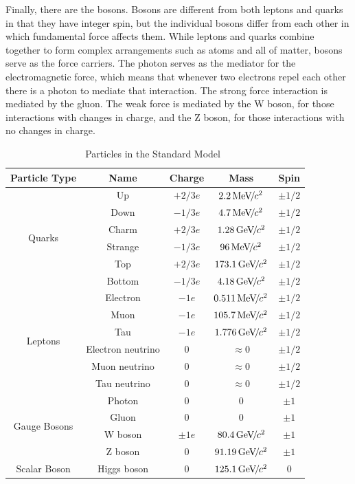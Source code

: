 Finally, there are the bosons. Bosons are different from both leptons and quarks in that they have integer spin, but the individual bosons differ from each other in which fundamental force affects them. While leptons and quarks combine together to form complex arrangements such as atoms and all of matter, bosons serve as the force carriers. The photon serves as the mediator for the electromagnetic force, which means that whenever two electrons repel each other there is a photon to mediate that interaction. The strong force interaction is mediated by the gluon. The weak force is mediated by the W boson, for those interactions with changes in charge, and the Z boson, for those interactions with no changes in charge. 

\begin{table}
\caption{Particles in the Standard Model~\cite{pdg}}
\label{tab:particles}
\begin{center}
\begin{tabular}{|c|c|c|c|c|}
\hline
Particle Type & Name & Charge & Mass & Spin \\
\hline
\multirow{6}{*}{Quarks} & Up & $+2/3e$ & $2.2{\,\text{Me\hspace{-.08em}V\hspace{-0.16em}/\hspace{-0.08em}}c^\text{2}}$ & $\pm 1/2$ \\
& Down & $-1/3e$ & $4.7{\,\text{Me\hspace{-.08em}V\hspace{-0.16em}/\hspace{-0.08em}}c^\text{2}}$ & $\pm 1/2$ \\
& Charm & $+2/3e$ & $1.28{\,\text{Ge\hspace{-.08em}V\hspace{-0.16em}/\hspace{-0.08em}}c^\text{2}}$ & $\pm 1/2$ \\
& Strange & $-1/3e$ & $96{\,\text{Me\hspace{-.08em}V\hspace{-0.16em}/\hspace{-0.08em}}c^\text{2}}$ & $\pm 1/2$ \\
& Top & $+2/3e$ & $173.1{\,\text{Ge\hspace{-.08em}V\hspace{-0.16em}/\hspace{-0.08em}}c^\text{2}}$ & $\pm 1/2$ \\
& Bottom & $-1/3e$ & $4.18{\,\text{Ge\hspace{-.08em}V\hspace{-0.16em}/\hspace{-0.08em}}c^\text{2}}$ & $\pm 1/2$ \\
\hline
\multirow{6}{*}{Leptons} & Electron & $-1e$ & $0.511{\,\text{Me\hspace{-.08em}V\hspace{-0.16em}/\hspace{-0.08em}}c^\text{2}}$ & $\pm 1/2$ \\
& Muon & $-1e$ & $105.7{\,\text{Me\hspace{-.08em}V\hspace{-0.16em}/\hspace{-0.08em}}c^\text{2}}$ & $\pm 1/2$ \\
& Tau & $-1e$ & $1.776{\,\text{Ge\hspace{-.08em}V\hspace{-0.16em}/\hspace{-0.08em}}c^\text{2}}$ & $\pm 1/2$ \\
& Electron neutrino & $0$ & $\approx 0$ & $\pm 1/2$ \\
& Muon neutrino & $0$ & $\approx 0$ & $\pm 1/2$ \\
& Tau neutrino & $0$ & $\approx 0$ & $\pm 1/2$ \\
\hline
\multirow{4}{*}{Gauge Bosons} & Photon & 0 & 0 & $\pm 1$ \\
& Gluon & 0 & 0 & $\pm 1$ \\
& W boson & $\pm 1e$ & $80.4{\,\text{Ge\hspace{-.08em}V\hspace{-0.16em}/\hspace{-0.08em}}c^\text{2}}$ & $\pm 1$ \\
& Z boson & 0 & $91.19{\,\text{Ge\hspace{-.08em}V\hspace{-0.16em}/\hspace{-0.08em}}c^\text{2}}$ & $\pm 1$ \\
\hline
Scalar Boson & Higgs boson & 0 & $125.1{\,\text{Ge\hspace{-.08em}V\hspace{-0.16em}/\hspace{-0.08em}}c^\text{2}}$ & 0 \\
\hline
\end{tabular}
\end{center}
\end{table} 

